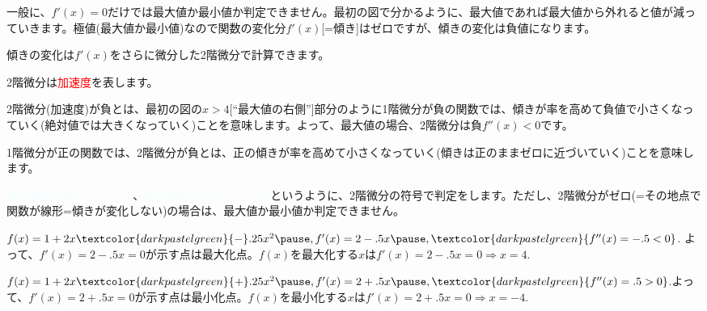 \begin{frame}[t]{}
\begin{dinglist}{45}
\vspace{1.0ex}\setlength{\itemsep}{1.0ex}\setlength{\baselineskip}{12pt}
\item	一般に、$f'(x)=0$だけでは最大値か最小値か判定できません。最初の図で分かるように、最大値であれば最大値から外れると値が減っていきます。極値(最大値か最小値)なので関数の変化分$f'(x)$[=傾き]はゼロですが、傾きの変化は負値になります。
\pause
\item	傾きの変化は$f'(x)$をさらに微分した2階微分で計算できます。
	\begin{dinglist}{43}
	\vspace{1.0ex}\setlength{\itemsep}{1.0ex}\setlength{\baselineskip}{12pt}
\pause
	\item	2階微分は\textcolor{red}{加速度}を表します。
\pause
	\item	2階微分(加速度)が負とは、最初の図の$x>4$[``最大値の右側'']部分のように1階微分が負の関数では、傾きが率を高めて負値で小さくなっていく(絶対値では大きくなっていく)ことを意味します。よって、最大値の場合、2階微分は負$f''(x)<0$です。
\pause
	\item	1階微分が正の関数では、2階微分が負とは、正の傾きが率を高めて小さくなっていく(傾きは正のままゼロに近づいていく)ことを意味します。
	\end{dinglist}
\pause
\item	\textcolor{azure}{最大値ならば$f''(x)<0$}、\textcolor{azure}{最小値ならば$f''(x)>0$}というように、2階微分の符号で判定をします。ただし、2階微分がゼロ(=その地点で関数が線形=傾きが変化しない)の場合は、最大値か最小値か判定できません。
\end{dinglist}
\end{frame}

\begin{frame}[t]{}
\begin{dinglist}{43}
\vspace{1.0ex}\setlength{\itemsep}{1.0ex}\setlength{\baselineskip}{12pt}
\pause
\item	$f(x)=1+2x\textcolor{darkpastelgreen}{-}.25x^{2}\pause , f'(x)=2-.5x\pause , \textcolor{darkpastelgreen}{f''(x)=-.5<0}$. \pause よって、$f'(x)=2-.5x=0$が示す点は最\textcolor{darkpastelgreen}{大}化点。\pause $f(x)$を最大化する$x$は$f'(x)=2-.5x=0 \Rightarrow x=4.$
\pause
\item	$f(x)=1+2x\textcolor{darkpastelgreen}{+}.25x^{2}\pause , f'(x)=2+.5x\pause , \textcolor{darkpastelgreen}{f''(x)=.5>0}$.\pause  よって、$f'(x)=2+.5x=0$が示す点は最\textcolor{darkpastelgreen}{小}化点。\pause $f(x)$を最小化する$x$は$f'(x)=2+.5x=0 \Rightarrow x=-4.$
\end{dinglist}
\end{frame}

